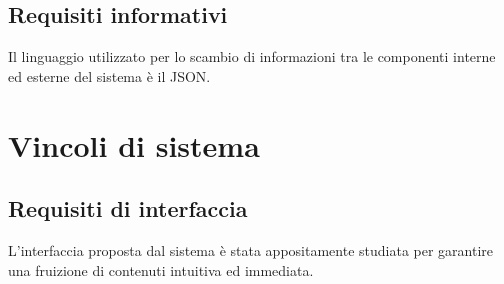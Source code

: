 \documentclass[a4paper,11pt,titlepage]{article}       %
\begin{document}
    \subsection{Requisiti informativi}
        Il linguaggio utilizzato per lo scambio di informazioni tra le componenti interne ed esterne del sistema è il JSON.

\newpage

\section{Vincoli di sistema}
    
    \subsection{Requisiti di interfaccia}
        L'interfaccia proposta dal sistema è stata appositamente studiata per garantire una fruizione di contenuti intuitiva ed immediata.
        
\end{document}
